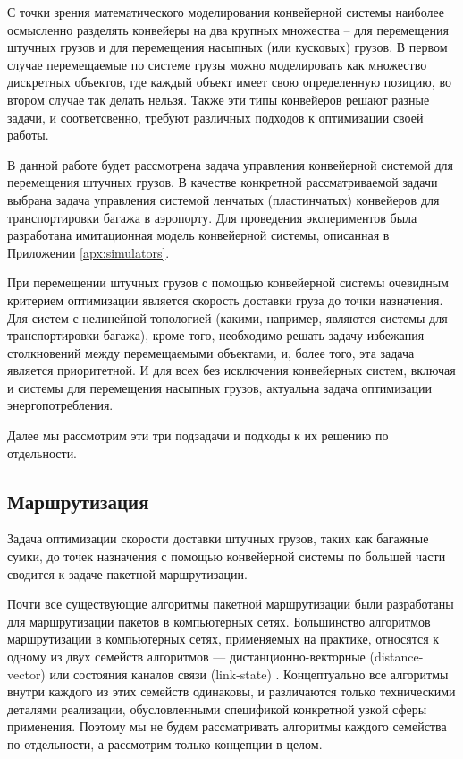 \documentclass[specification,annotation,times]{itmo-student-thesis}
\theoremstyle{definition}
\begin{document}
С точки зрения математического моделирования конвейерной системы наиболее
осмысленно разделять конвейеры на два крупных множества -- для
перемещения штучных грузов и для перемещения насыпных (или кусковых) грузов.
В первом случае перемещаемые по системе грузы можно моделировать как множество
дискретных объектов, где каждый объект имеет свою определенную позицию, во
втором случае так делать нельзя. Также эти типы конвейеров решают разные задачи,
и соответсвенно, требуют различных подходов к оптимизации своей работы.

В данной работе будет рассмотрена задача управления конвейерной системой для
перемещения штучных грузов. В качестве конкретной рассматриваемой задачи выбрана
задача управления системой ленчатых (пластинчатых) конвейеров для
транспортировки багажа в аэропорту. Для проведения экспериментов 
была разработана имитационная модель конвейерной системы, описанная в Приложении
\ref{apx:simulators}.

При перемещении штучных грузов с помощью конвейерной системы очевидным критерием
оптимизации является скорость доставки груза до точки назначения. Для систем с
нелинейной топологией (какими, например, являются системы для транспортировки
багажа), кроме того, необходимо решать задачу избежания столкновений между
перемещаемыми объектами, и, более того, эта задача является приоритетной.
И для всех без исключения конвейерных систем, включая и системы для перемещения
насыпных грузов, актуальна задача оптимизации энергопотребления.

Далее мы рассмотрим эти три подзадачи и подходы к их решению по отдельности.

\subsection{Маршрутизация}

Задача оптимизации скорости доставки штучных грузов, таких как багажные сумки,
до точек назначения с помощью конвейерной системы по большей части сводится к
задаче пакетной маршрутизации.

Почти все существующие алгоритмы пакетной маршрутизации были разработаны для
маршрутизации пакетов в компьютерных сетях. Большинство алгоритмов маршрутизации
в компьютерных сетях, применяемых на практике, относятся к одному из двух
семейств алгоритмов --- дистанционно-векторные (distance-vector) \cite{arpanet-orig} или
состояния каналов связи (link-state) \cite{link-state-arpanet}.
Концептуально все алгоритмы внутри каждого из этих семейств одинаковы, и различаются только
техническими деталями реализации, обусловленными спецификой конкретной узкой
сферы применения. Поэтому мы не будем рассматривать алгоритмы каждого семейства
по отдельности, а рассмотрим только концепции в целом.
\end{document}

